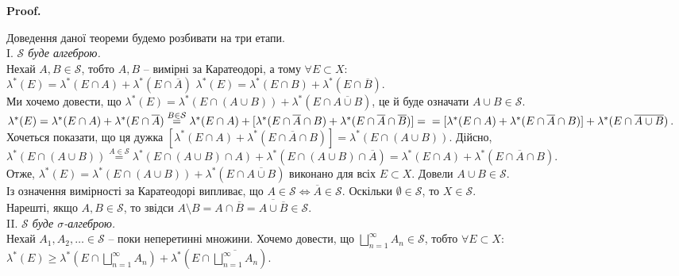 \documentclass[a4paper, 10pt]{article}
\makeatletter
\theoremstyle{theoremdd}
\renewenvironment{proof}[1][Proof.\\]{\par
\pushQED{\hfill \qed}%
\normalfont \topsep6\p@\@plus6\p@\relax
\trivlist
\item\relax
{\bfseries
#1\@addpunct{.}}\hspace\labelsep\ignorespaces
}{%
\popQED\endtrivlist\@endpefalse
}
\makeatother
\begin{document}
\begin{proof}
Доведення даної теореми будемо розбивати на три етапи.\\
I. \textit{$\mathcal{S}$ буде алгеброю.}\\
Нехай $A,B \in \mathcal{S}$, тобто $A,B$ -- вимірні за Каратеодорі, а тому $\forall E \subset X$:\\
$\lambda^*(E) = \lambda^*(E \cap A) + \lambda^*(E \cap \overline{A})$ \qquad $\lambda^*(E) = \lambda^*(E \cap B) + \lambda^*(E \cap \overline{B})$.\\
Ми хочемо довести, що $\lambda^*(E) = \lambda^*(E \cap (A \cup B)) + \lambda^*(E \cap \overline{A \cup B})$, це й буде означати $A \cup B \in \mathcal{S}$.\\
$\lambda^*(E) = \lambda^*(E \cap A) + \lambda^*(E \cap \overline{A}) \overset{B \in \mathcal{S}}{=} \lambda^*(E \cap A) + [\lambda^*(E \cap \overline{A} \cap B) + \lambda^*(E \cap \overline{A} \cap \overline{B})] = \\
= [\lambda^*(E \cap A) + \lambda^*(E \cap \overline{A} \cap B)] + \lambda^*(E \cap \overline{A \cup B})$.\\
Хочеться показати, що ця дужка $[\lambda^*(E \cap A) + \lambda^*(E \cap \overline{A} \cap B)] = \lambda^*(E \cap (A \cup B))$. Дійсно,
$\lambda^*(E \cap (A \cup B)) \overset{A \in \mathcal{S}}{=} \lambda^*(E \cap (A \cup B) \cap A) + \lambda^*(E \cap (A \cup B) \cap \overline{A}) = \lambda^*(E \cap A) + \lambda^*(E \cap \overline{A} \cap B)$.\\
Отже, $\lambda^*(E) = \lambda^*(E \cap (A \cup B)) + \lambda^*(E \cap \overline{A \cup B})$ виконано для всіх $E \subset X$. Довели $A \cup B \in \mathcal{S}$.\\
Із означення вимірності за Каратеодорі випливає, що $A \in \mathcal{S} \iff \overline{A} \in \mathcal{S}$. Оскільки $\emptyset \in \mathcal{S}$, то $X \in \mathcal{S}$.\\
Нарешті, якщо $A,B \in \mathcal{S}$, то звідси $A \setminus B = A \cap \overline{B} = \overline{A \cup \overline{B}} \in \mathcal{S}$.
\bigskip \\
II. \textit{$\mathcal{S}$ буде $\sigma$-алгеброю.}\\
Нехай $A_1,A_2,\dots \in \mathcal{S}$ -- поки неперетинні множини. Хочемо довести, що $\displaystyle\bigsqcup_{n=1}^\infty A_n \in \mathcal{S}$, тобто $\forall E \subset X$:\\
$\displaystyle\lambda^*(E) \geq \lambda^*\left( E \cap \bigsqcup_{n=1}^\infty A_n \right) + \lambda^*\left( E \cap \overline{\bigsqcup_{n=1}^\infty A_n} \right)$.\\

\end{proof}
\end{document}
